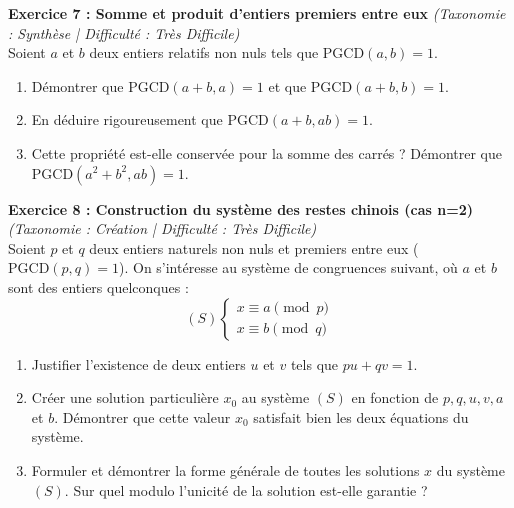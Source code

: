 \vspace{0.5cm}

\noindent\textbf{Exercice 7 : Somme et produit d'entiers premiers entre eux} \textit{(Taxonomie : Synthèse | Difficulté : Très Difficile)} \\
Soient $a$ et $b$ deux entiers relatifs non nuls tels que $\text{PGCD}(a, b) = 1$.
\begin{enumerate}
    \item Démontrer que $\text{PGCD}(a+b, a) = 1$ et que $\text{PGCD}(a+b, b) = 1$.
    \item En déduire rigoureusement que $\text{PGCD}(a+b, ab) = 1$.
    \item Cette propriété est-elle conservée pour la somme des carrés ? Démontrer que $\text{PGCD}(a^2+b^2, ab) = 1$.
\end{enumerate}

\vspace{0.5cm}

\noindent\textbf{Exercice 8 : Construction du système des restes chinois (cas n=2)} \textit{(Taxonomie : Création | Difficulté : Très Difficile)} \\
Soient $p$ et $q$ deux entiers naturels non nuls et premiers entre eux ($\text{PGCD}(p, q) = 1$). On s'intéresse au système de congruences suivant, où $a$ et $b$ sont des entiers quelconques :
$$
(S) \begin{cases} 
x \equiv a \pmod{p} \\ 
x \equiv b \pmod{q} 
\end{cases}
$$
\begin{enumerate}
    \item Justifier l'existence de deux entiers $u$ et $v$ tels que $pu + qv = 1$.
    \item Créer une solution particulière $x_0$ au système $(S)$ en fonction de $p, q, u, v, a$ et $b$. Démontrer que cette valeur $x_0$ satisfait bien les deux équations du système.
    \item Formuler et démontrer la forme générale de toutes les solutions $x$ du système $(S)$. Sur quel modulo l'unicité de la solution est-elle garantie ?
\end{enumerate}